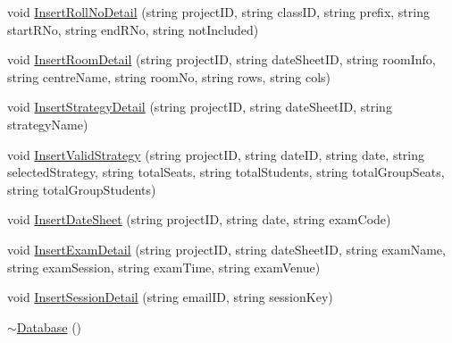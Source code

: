 \begin{DoxyCompactItemize}
\item 
void \hyperlink{classDatabase_a91882082bd5309ba21d7250f0877ab39}{Insert\-Roll\-No\-Detail} (string project\-I\-D, string class\-I\-D, string prefix, string start\-R\-No, string end\-R\-No, string not\-Included)
\item 
void \hyperlink{classDatabase_a27092ca18e5f95b2808e54ad89c6ca35}{Insert\-Room\-Detail} (string project\-I\-D, string date\-Sheet\-I\-D, string room\-Info, string centre\-Name, string room\-No, string rows, string cols)
\item 
void \hyperlink{classDatabase_a8a13b478ab9c5c9fabc07b9513530bc0}{Insert\-Strategy\-Detail} (string project\-I\-D, string date\-Sheet\-I\-D, string strategy\-Name)
\item 
void \hyperlink{classDatabase_ae20d8dbfb3d8755cd4cf508a503fd9b6}{Insert\-Valid\-Strategy} (string project\-I\-D, string date\-I\-D, string date, string selected\-Strategy, string total\-Seats, string total\-Students, string total\-Group\-Seats, string total\-Group\-Students)
\item 
void \hyperlink{classDatabase_ab410079853d849a9104be0689abee878}{Insert\-Date\-Sheet} (string project\-I\-D, string date, string exam\-Code)
\item 
void \hyperlink{classDatabase_a1c68383f46e3c3026ff53aeb4e5f76ab}{Insert\-Exam\-Detail} (string project\-I\-D, string date\-Sheet\-I\-D, string exam\-Name, string exam\-Session, string exam\-Time, string exam\-Venue)
\item 
void \hyperlink{classDatabase_a61963a0b66aca78ffa950b22ee959c47}{Insert\-Session\-Detail} (string email\-I\-D, string session\-Key)
\item 
\hyperlink{classDatabase_a84d399a2ad58d69daab9b05330e1316d}{$\sim$\-Database} ()
\end{DoxyCompactItemize}
